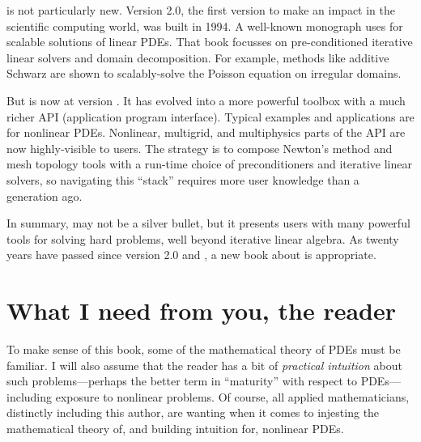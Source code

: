 \PETSc is not particularly new.  Version 2.0, the first version to make an impact in the scientific computing world, was built in 1994.  A well-known monograph \citet{Smithetal1996} uses  for scalable solutions of linear PDEs.  That book focusses on pre-conditioned iterative linear solvers and domain decomposition.  For example, methods like additive Schwarz are shown to scalably-solve the Poisson equation on irregular domains.

But \PETSc is now at version \PETSCVERSION.  It has evolved into a more powerful toolbox with a much richer API (application program interface).  Typical examples and applications are for nonlinear PDEs.  Nonlinear, multigrid, and multiphysics parts of the API are now highly-visible to users.  The \PETSc strategy is to compose Newton's method and mesh topology tools with a run-time choice of preconditioners and iterative linear solvers, so navigating this ``stack'' requires more user knowledge than a generation ago.

In summary, \PETSc may not be a silver bullet, but it presents users with many powerful tools for solving hard problems, well beyond iterative linear algebra.  As twenty years have passed since version 2.0 and \citet{Smithetal1996}, a new book about \PETSc is appropriate.


\section{What I need from you, the reader}

To make sense of this book, some of the mathematical theory of PDEs must be familiar.  I will also assume that the reader has a bit of \emph{practical intuition} about such problems---perhaps the better term in ``maturity'' with respect to PDEs---including exposure to nonlinear problems.  Of course, all applied mathematicians, distinctly including this author, are wanting when it comes to injesting the mathematical theory of, and building intuition for, nonlinear PDEs.

